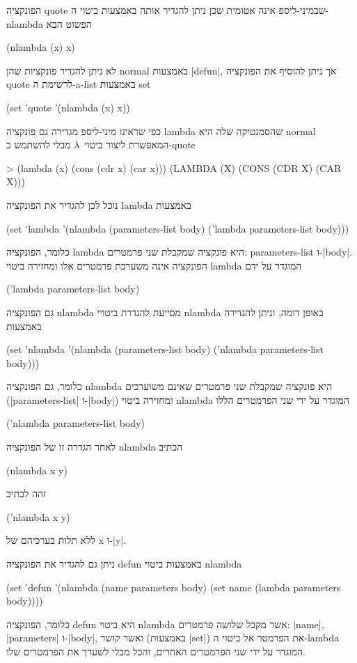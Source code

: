 הפונקציה quote שבמיני-ליספ אינה אטומית שכן ניתן להגדיר אותה באמצעות ביטוי
ה-nlambda הפשוט הבא
\begin{LISP}
(nlambda (x) x)
\end{LISP}
לא ניתן להגדיר פונקציות שהן normal באמצעות \E|defun|, אך ניתן להוסיף את הפונקציה
quote לרשימת ה-a-list באמצעות set
\begin{LIBRARY}
(set 'quote
  '(nlambda (x) x))
\end{LIBRARY}
כפי שראינו מיני-ליספ מגדירה גם פונקציה lambda שהסמנטיקה שלה היא normal המאפשרת
ליצור ביטוי~$λ$ מבלי להשתמש ב-quote
\begin{LISP}
> (lambda (x) (cons (cdr x) (car x)))
(LAMBDA (X) (CONS (CDR X) (CAR X)))
\end{LISP}
נוכל לכן להגדיר את הפונקציה lambda באמצעות
\begin{LIBRARY}
(set 'lambda
  '(nlambda (parameters-list body) ('lambda parameters-list body)))
\end{LIBRARY}
כלומר, הפונקציה lambda היא פונקציה שמקבלת שני פרמטרים: parameters-list
ו-\E|body|. הפונקציה אינה משערכת פרמטרים אלו ומחזירה ביטוי lambda המוגדר על ידם
\begin{LISP}
  ('lambda parameters-list body)
\end{LISP}
גם הפונקציה nlambda מסייעת להגדרת ביטויי nlambda באופן דומה, וניתן להגדירה
באמצעות
\begin{LIBRARY}
(set 'nlambda
  '(nlambda (parameters-list body) ('nlambda parameters-list body)))
\end{LIBRARY}
כלומר, גם הפונקציה nlambda היא פונקציה שמקבלת שני פרמטרים שאינם משוערכים
(\E|parameters-list| ו-\E|body|) ומחזירה ביטוי nlambda המוגדר על ידי
שני הפרמטרים הללו
\begin{LISP}
  ('nlambda parameters-list body)
\end{LISP}
לאחר הגדרה זו של הפונקציה nlambda הכתיב
\begin{LISP}
  (nlambda x y)
\end{LISP}
זהה לכתיב
\begin{LISP}
  ('nlambda x y)
\end{LISP}
ללא תלות בערכיהם של x ו-\E|y|.

ניתן גם להגדיר את הפונקציה defun באמצעות ביטוי nlambda
\begin{LIBRARY}
(set 'defun
  '(nlambda (name parameters body)
    (set name (lambda parameters body))))
\end{LIBRARY}
כלומר, הפונקציה defun היא ביטוי nlambda אשר מקבל שלושה פרמטרים: \E|name|,
\E|parameters| ו-\E|body|, ואשר קושר (באמצעות \E|set|) את הפרמטר אל ביטוי
ה-lambda המוגדר על ידי שני הפרמטרים האחרים, והכל מבלי לשערך את הפרמטרים שלו.

